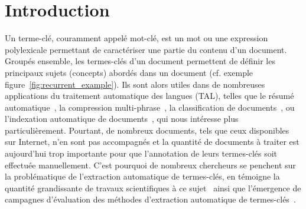 \section{Introduction}
\label{sec:introduction}
  Un terme-clé, couramment appelé mot-clé, est un mot ou une expression
  polylexicale permettant de caractériser une partie du contenu d'un document.
  Groupés ensemble, les termes-clés d'un document permettent de définir les
  principaux sujets (concepts) abordés dans un document (cf. exemple
  figure~\ref{fig:recurrent_example}). Ils sont alors utiles dans de
  nombreuses applications du traitement automatique des langues (TAL), telles
  que  le résumé automatique~\cite{avanzo2005keyphrase}, la compression
  multi-phrase~\cite{boudin2013multisentencecompression}, la classification de
  documents~\cite{han2007webdocumentclustering}, ou l'indexation automatique de
  documents~\cite{medelyan2008smalltrainingset}, qui nous intéresse plus
  particulièrement. Pourtant, de nombreux documents, tels que ceux disponibles
  sur Internet, n'en sont pas accompagnés et la quantité de documents à traiter
  est aujourd'hui trop importante pour que l'annotation de leurs termes-clés
  soit effectuée manuellement. C'est pourquoi de nombreux chercheurs se penchent
  sur la problématique de l'extraction automatique de termes-clés, en témoigne
  la quantité grandissante de travaux scientifiques à ce
  sujet~\cite{hasan2014state_of_the_art} ainsi que l'émergence de campagnes
  d'évaluation des méthodes d'extraction automatique de
  termes-clés~\cite{kim2010semeval,paroubek2012deft}.

